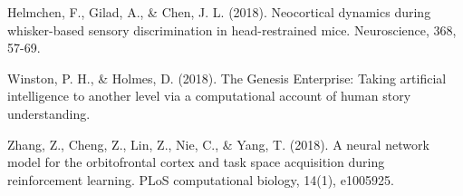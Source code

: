 \documentclass[11pt]{article}
\begin{document}
Helmchen, F., Gilad, A., \& Chen, J. L. (2018). Neocortical dynamics during whisker-based sensory discrimination in head-restrained mice. Neuroscience, 368, 57-69.

Winston, P. H., \& Holmes, D. (2018). The Genesis Enterprise: Taking artificial intelligence to another level via a computational account of human story understanding.

Zhang, Z., Cheng, Z., Lin, Z., Nie, C., \& Yang, T. (2018). A neural network model for the orbitofrontal cortex and task space acquisition during reinforcement learning. PLoS computational biology, 14(1), e1005925.

\newpage



\end{document}
